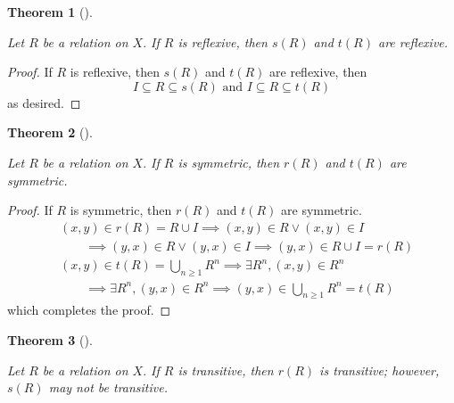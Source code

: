 \documentclass[
  letterpaper,
  10pt,
  reqno,
  twopage,
  openany]{book}
\theoremstyle{plain}
\theoremstyle{definition}
\theoremstyle{definition}
\theoremstyle{definition}
\theoremstyle{plain}
\theoremstyle{plain}
\newtheorem{theorem}{Theorem}[chapter]
\theoremstyle{remark}
\begin{document}
\leavevmode{}%
\begin{theorem}[]\label{thm-reflexive-symmetric-transitive}

Let \(R\) be a relation on \(X.\) If \(R\) is reflexive, then \(s(R)\)
and \(t(R)\) are reflexive.

\end{theorem}

\begin{proof}

If \(R\) is reflexive, then \(s(R)\) and \(t(R)\) are reflexive, then \[
I\subseteq R\subseteq s(R)
\text{ and }
I\subseteq R \subseteq t(R)
\] as desired.

\end{proof}

\leavevmode{}%
\begin{theorem}[]\label{thm-symmetric-reflexive-transitive}

Let \(R\) be a relation on \(X.\) If \(R\) is symmetric, then \(r(R)\)
and \(t(R)\) are symmetric.

\end{theorem}

\begin{proof}

If \(R\) is symmetric, then \(r(R)\) and \(t(R)\) are symmetric.
\begin{align*}
& (x,y)\in r(R)=R\cup I \implies (x,y)\in R \lor (x,y)\in I \\ 
& \qquad \implies (y,x)\in R \lor (y,x)\in I \implies (y,x)\in R \cup I =r(R)\\ 
& (x,y)\in t(R)= \bigcup_{n\geq 1}R^n \implies \exists R^n, (x,y)\in R^n \\ 
& \qquad \implies \exists R^n, (y,x)\in R^n \implies (y,x)\in \bigcup_{n\geq 1}R^n=t(R) 
\end{align*} which completes the proof.

\end{proof}

\leavevmode{}%
\begin{theorem}[]\label{thm-transitive-reflexive-not-necc-symmetric}

Let \(R\) be a relation on \(X.\) If \(R\) is transitive, then \(r(R)\)
is transitive; however, \(s(R)\) may not be transitive.

\end{theorem}
\end{document}
